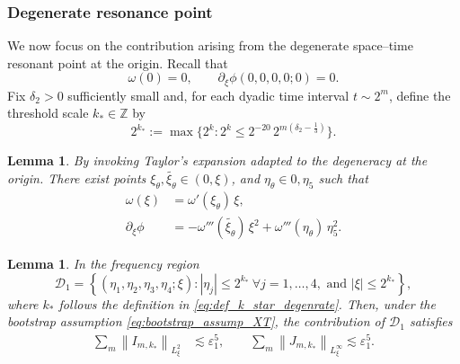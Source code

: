 \documentclass[reqno,english,11pt]{amsart}
\newcommand{\eps}{\varepsilon}
\newcommand{\snorm}[1]{\left\|#1\right\|}
\newtheorem{lemma}[theorem]{Lemma}
\theoremstyle{definition}
\numberwithin{equation}{section}
\begin{document}
\subsubsection{Degenerate resonance point}
We now focus on the contribution arising from the degenerate space--time resonant point at the origin.
Recall that
$$\omega(0)=0, \qquad \partial_\xi \phi(0,0,0,0;0)=0.$$ Fix $\delta_2>0$ sufficiently small and, for each dyadic time interval $t\sim 2^m$, define the threshold scale $k_*\in\mathbb{Z}$ by
\begin{equation}\label{eq:def_k_star_degenrate}
2^{k_*} := \max\Big\{2^k : 2^k \le 2^{-20}\,2^{m(\delta_2-\frac13)}\Big\}.
\end{equation}
\begin{lemma}\label{lem:deg_taylor}
By invoking Taylor's expansion adapted to the degeneracy at the origin.
There exist points $\xi_\theta, \widetilde{\xi_\theta}\in (0,\xi)$, and $\eta_{\theta}\in 0,\eta_5$ such that
\begin{subequations}\label{eq:degenerate_taylor}
\begin{align}
\omega(\xi) &= \omega'(\xi_\theta)\,\xi, \\
\partial_\xi \phi &= -\omega'''(\widetilde{\xi_\theta})\,\xi^2
+ \omega'''(\eta_\theta)\,\eta_5^2.
\end{align}
\end{subequations}
\end{lemma}
\begin{lemma}
\label{prop:deg_case_1}
    In the frequency region
    \begin{equation*}
        \mathcal{D}_1=\left\{ (\eta_1,\eta_2,\eta_3,\eta_4; \xi) : |\eta_j| \le 2^{k_*} \ \forall j=1,\dots,4, \text{ and } |\xi| \le 2^{k_*} \right\},
    \end{equation*}
    where $k_*$ follows the definition in \eqref{eq:def_k_star_degenrate}. Then, under the bootstrap assumption \eqref{eq:bootstrap_assump_XT},  the contribution of $\mathcal{D}_1$ satisfies
    \begin{align*}
        \sum_m \snorm{I_{m,k_*}}_{L^2_\xi}&\lesssim \eps_1^5,\qquad
        \sum_m \snorm{J_{m,k_*}}_{L^\infty_\xi}\lesssim \eps_1^5.
    \end{align*}
    
\end{lemma}
\end{document}

